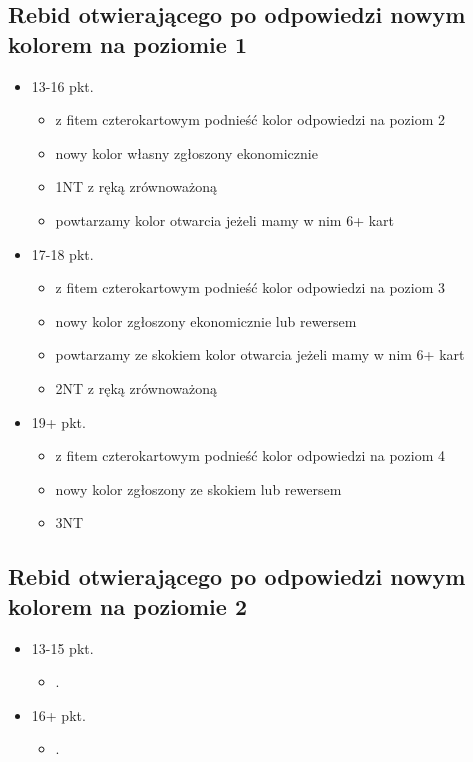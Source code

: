 \documentclass{article}
\begin{document}
    	\subsection{Rebid otwierającego po odpowiedzi nowym kolorem na poziomie 1}
    	\begin{itemize}
    		\item 13-16 pkt.
    			\begin{itemize}
    				\item z fitem czterokartowym podnieść kolor odpowiedzi na poziom 2
    				\item nowy kolor własny zgłoszony ekonomicznie
    				\item 1NT z ręką zrównoważoną
    				\item powtarzamy kolor otwarcia jeżeli mamy w nim 6+ kart
    			\end{itemize}
    		\item 17-18 pkt.
    			\begin{itemize}
    				\item z fitem czterokartowym podnieść kolor odpowiedzi na poziom 3
    				\item nowy kolor zgłoszony ekonomicznie lub rewersem
    				\item powtarzamy ze skokiem kolor otwarcia jeżeli mamy w nim 6+ kart
    				\item 2NT z ręką zrównoważoną
    			\end{itemize}
    		\item 19+ pkt.
    			\begin{itemize}
    				\item z fitem czterokartowym podnieść kolor odpowiedzi na poziom 4
    				\item nowy kolor zgłoszony ze skokiem lub rewersem
    				\item 3NT
    			\end{itemize}
    	\end{itemize}
    	\subsection{Rebid otwierającego po odpowiedzi nowym kolorem na poziomie 2}
    	\begin{itemize}
    		\item 13-15 pkt.
    			\begin{itemize}
    				\item .
    			\end{itemize}
    		\item 16+ pkt.
    			\begin{itemize}
    				\item .
    			\end{itemize}
    	\end{itemize}
\end{document}
